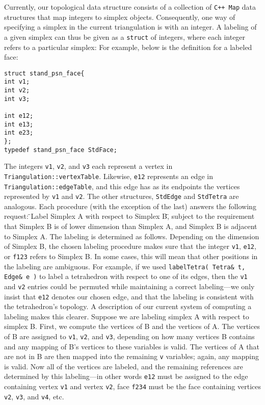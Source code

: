 Currently, our topological data structure consists of a collection of \texttt{C++ Map} data structures that map integers to simplex objects. Consequently, one way of specifying a simplex in the current triangulation is with an integer. A labeling of a given simplex can thus be given as a \texttt{struct} of integers, where each integer refers to a particular simplex:\newline
For example, below is the definition for a labeled face:
{\small{\begin{verbatim} 
struct stand_psn_face{
int v1;
int v2;
int v3;

int e12;
int e13;
int e23;
};
typedef stand_psn_face StdFace;
\end{verbatim}
}}
The integers \texttt{v1}, \texttt{v2}, and \texttt{v3} each represent a vertex in \texttt{Triangulation::vertexTable}. Likewise, \texttt{e12} represents an edge in \texttt{Triangulation::edgeTable}, and this edge has as its endpoints the vertices represented by \texttt{v1} and \texttt{v2}. The other structures, \texttt{StdEdge} and \texttt{StdTetra} are analogous.\newline
Each procedure (with the exception of the last) answers the following request: \"{}Label Simplex A with respect to Simplex B,\"{} subject to the requirement that Simplex B is of lower dimension than Simplex A, and Simplex B is adjacent to Simplex A.\newline
The labeling is determined as follows. Depending on the dimension of Simplex B, the chosen labeling procedure makes sure that the integer \texttt{v1}, \texttt{e12}, or \texttt{f123} refers to Simplex B. In some cases, this will mean that other positions in the labeling are ambiguous. For example, if we used \texttt{labelTetra( Tetra\& t, Edge\& e )} to label a tetrahedron with respect to one of its edges, then the \texttt{v1} and \texttt{v2} entries could be permuted while maintaining a correct labeling---we only insist that \texttt{e12} denotes our chosen edge, and that the labeling is consistent with the tetrahedron's topology.\newline
A description of our current system of computing a labeling makes this clearer. Suppose we are labeling simplex A with respect to simplex B. First, we compute the vertices of B and the vertices of A. The vertices of B are assigned to \texttt{v1}, \texttt{v2}, and \texttt{v3}, depending on how many vertices B contains and any mapping of B's vertices to these variables is valid. The vertices of A that are not in B are then mapped into the remaining \texttt{v} variables; again, any mapping is valid. Now all of the vertices are labeled, and the remaining references are determined by this labeling---in other words \texttt{e12} must be assigned to the edge containing vertex \texttt{v1} and vertex \texttt{v2}, face \texttt{f234} must be the face containing vertices \texttt{v2}, \texttt{v3}, and \texttt{v4}, etc.\newline
